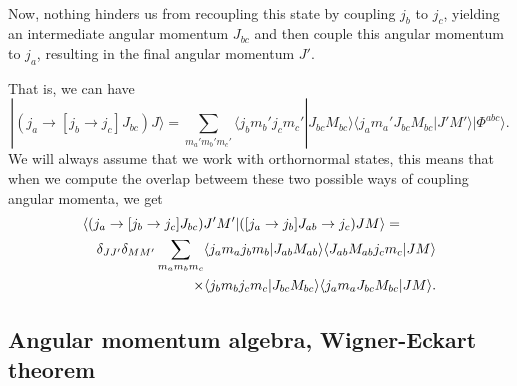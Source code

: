 \documentclass[%
twoside,                 %
final,                   %
10pt]{article}
\begin{document}
\paragraph{}
Now, nothing hinders us from recoupling this state by coupling $j_b$ to $j_c$, yielding an intermediate angular momentum $J_{bc}$ and then couple this angular momentum to $j_a$, resulting in the final angular momentum $J'$. 

That is, we can have 
\[
| (j_a\rightarrow [j_b\rightarrow j_c]J_{bc}) J\rangle = \sum_{m_a'm_b'm_c'}\langle j_bm_b'j_cm_c'|J_{bc}M_{bc}\rangle \langle j_am_a'J_{bc}M_{bc}|J'M'\rangle|\Phi^{abc}\rangle .
\]
We will always assume that we work with orthornormal states, this means that when we compute the overlap betweem these two possible ways of coupling angular momenta, we get 
\begin{eqnarray}
\nonumber
\lefteqn{ \langle (j_a\rightarrow [j_b\rightarrow j_c]J_{bc}) J'M'| ([j_a\rightarrow j_b]J_{ab}\rightarrow j_c) JM\rangle = } \\
\nonumber
& & \delta_{JJ'}\delta_{MM'}\sum_{m_am_bm_c}\langle j_am_aj_bm_b|J_{ab}M_{ab}\rangle \langle J_{ab}M_{ab}j_cm_c|JM\rangle \\
& & \times \langle j_bm_bj_cm_c|J_{bc}M_{bc}\rangle \langle j_am_aJ_{bc}M_{bc}|JM\rangle . \nonumber
\end{eqnarray}



\subsection{Angular momentum algebra, Wigner-Eckart theorem}

\end{document}
